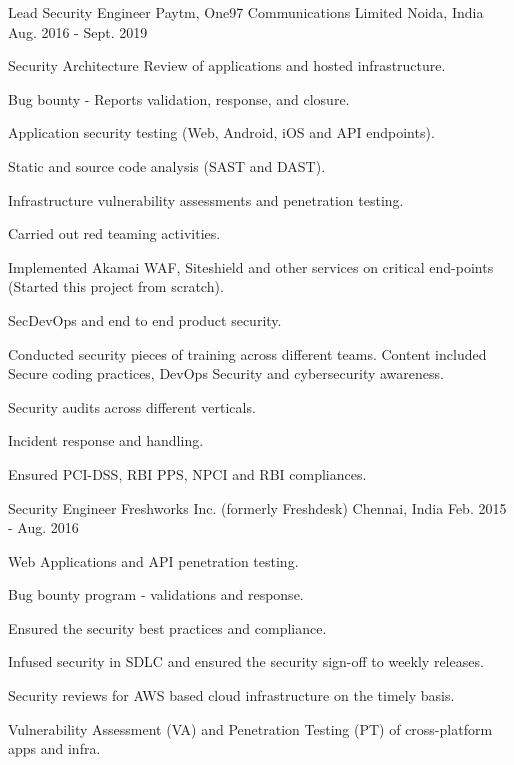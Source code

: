 \begin{cventries}
  \cventry
    {Lead Security Engineer} %
    {Paytm, One97 Communications Limited} %
    {Noida, India} %
    {Aug. 2016 - Sept. 2019} %
    {
      \begin{cvitems} %
        \item {Security Architecture Review of applications and hosted infrastructure.}
        \item {Bug bounty - Reports validation, response, and closure.}
        \item {Application security testing (Web, Android, iOS and API endpoints).}
        \item {Static and source code analysis (SAST and DAST).}
        \item {Infrastructure vulnerability assessments and penetration testing.}
        \item {Carried out red teaming activities.}
        \item {Implemented Akamai WAF, Siteshield and other services on critical end-points (Started this project from scratch).}
        \item {SecDevOps and end to end product security.}
        \item {Conducted security pieces of training across different teams. Content included Secure coding practices, DevOps Security and cybersecurity awareness.}
        \item {Security audits across different verticals.}
        \item {Incident response and handling.}
        \item {Ensured PCI-DSS, RBI PPS, NPCI and RBI compliances.}
      \end{cvitems}
    }

  \cventry
    {Security Engineer} %
    {Freshworks Inc. (formerly Freshdesk)} %
    {Chennai, India} %
    {Feb. 2015 - Aug. 2016} %
    {
      \begin{cvitems} %
        \item {Web Applications and API penetration testing.}
        \item {Bug bounty program - validations and response.}
        \item {Ensured the security best practices and compliance.}
        \item {Infused security in SDLC and ensured the security sign-off to weekly releases.}
        \item {Security reviews for AWS based cloud infrastructure on the timely basis.}
        \item {Vulnerability Assessment (VA) and Penetration Testing (PT) of cross-platform apps and infra.}
      \end{cvitems}
    }


\end{cventries}
